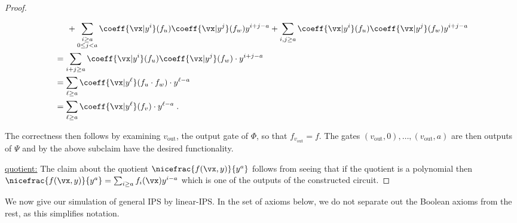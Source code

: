 \documentclass{toc}
\begin{document}
\begin{proof}
\begin{subproof}
\begin{itemize}
\begin{align*}
                                        &\hspace{.2in}+\sum_{\substack{i\ge a\\ 0\le j<a}}\coeff{\vx|y^i}(f_u)\coeff{\vx|y^j}(f_w) y^{i+j-a}
                                                +\sum_{i,j\ge a}\coeff{\vx|y^i}(f_u)\coeff{\vx|y^j}(f_w) y^{i+j-a}\\
                                        &=\sum_{i+j\ge a}\coeff{\vx|y^i}(f_u)\coeff{\vx|y^j}(f_w)\cdot y^{i+j-a}\\
                                        &=\sum_{\ell\ge a}\coeff{\vx|y^\ell}(f_u \cdot f_w)\cdot y^{\ell-a}\\
                                        &=\sum_{\ell\ge a}\coeff{\vx|y^\ell}(f_v)\cdot y^{\ell-a}
                                        \;.
                                        \qedhere
                                \end{align*}
                \end{itemize}
        \end{subproof}

        The correctness then follows by examining $v_\mathrm{out}$, the output gate of $\Phi$, so that $f_{v_\mathrm{out}}=f$.  The gates $(v_\mathrm{out},0),\ldots,(v_\mathrm{out},a)$ are then outputs of $\Psi$ and by the above subclaim have the desired functionality.

        \uline{quotient:} The claim about the quotient $\nicefrac{f(\vx,y)}{y^a}$ follows from seeing that if the quotient is a polynomial then $\nicefrac{f(\vx,y)}{y^a}=\sum_{i\ge a} f_i(\vx) y^{i-a}$ which is one of the outputs of the constructed circuit.
\end{proof}

We now give our simulation of general IPS by linear-IPS\@. In the
%
set of axioms below,   %
we do not separate out the Boolean axioms from the rest, as this simplifies notation.
\end{document}
